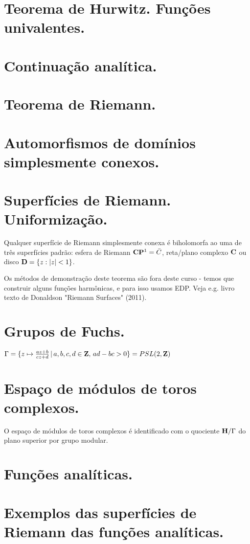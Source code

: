 \section{Teorema de Hurwitz. Funções univalentes.}

\section{Continuação analítica.}

\section{Teorema de Riemann.}

\section{Automorfismos de domínios simplesmente conexos.}

\section{Superfícies de Riemann. Uniformização.}

\begin{teorema}
Qualquer superfície de Riemann simplesmente conexa é biholomorfa ao uma de três superfícies padrão:
esfera de Riemann $\mathbf{C}\mathbf{P}^1 = \bar{C}$, reta/plano complexo $\mathbf{C}$ ou disco $\mathbf{D} = \{z : |z|<1\}$.
\end{teorema}
Os métodos de demonstração deste teorema são fora deste curso - temos que construir alguns funções
harmônicas, e para isso usamos EDP. Veja e.g. livro texto de Donaldson "Riemann Surfaces" (2011).

\section{Grupos de Fuchs.}

\begin{exem}
$\Gamma = \{ z \mapsto \frac{az+b}{cz+d} \,|\, a,b,c,d\in\mathbf{Z}, \, ad-bc>0 \} = PSL(2,\mathbf{Z})$
\end{exem}

\section{Espaço de módulos de toros complexos.}

\begin{teorema}
O espaço de módulos de toros complexos é identificado com o quociente $\mathbf{H}/\Gamma$
do plano superior por grupo modular.
\end{teorema}

\section{Funções analíticas.}

\section{Exemplos das superfícies de Riemann das funções analíticas.}

